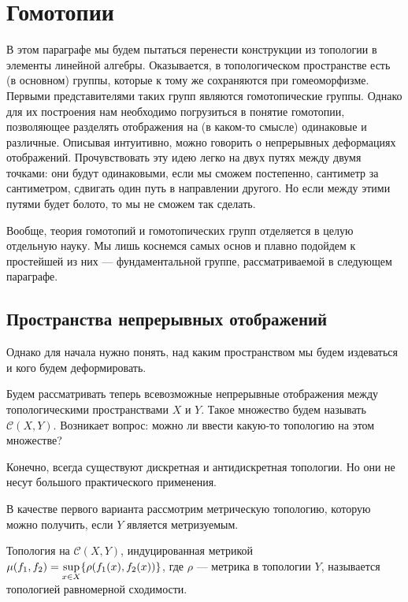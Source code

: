 \section{Гомотопии}
\begin{Intro}
В этом параграфе мы будем пытаться перенести конструкции из топологии в элементы линейной алгебры. Оказывается, в топологическом пространстве есть (в основном) группы, которые к тому же сохраняются при гомеоморфизме. Первыми представителями таких групп являются гомотопические группы. Однако для их построения нам необходимо погрузиться в понятие гомотопии, позволяющее разделять отображения на (в каком-то смысле) одинаковые и различные. Описывая интуитивно, можно говорить о непрерывных деформациях отображений. Прочувствовать эту идею легко на двух путях между двумя точками: они будут одинаковыми, если мы сможем постепенно, сантиметр за сантиметром, сдвигать один путь в направлении другого. Но если между этими путями будет болото, то мы не сможем так сделать.

Вообще, теория гомотопий и гомотопических групп отделяется в целую отдельную науку. Мы лишь коснемся самых основ и плавно подойдем к простейшей из них --- фундаментальной группе, рассматриваемой в следующем параграфе.
\end{Intro}
\subsection{Пространства непрерывных отображений}
Однако для начала нужно понять, над каким пространством мы будем издеваться и кого будем деформировать.

Будем рассматривать теперь всевозможные непрерывные отображения между топологическими пространствами $X$ и $Y$. Такое множество будем называть $\mathcal{C}(X, Y)$. Возникает вопрос: можно ли ввести какую-то топологию на этом множестве?

Конечно, всегда существуют дискретная и антидискретная топологии. Но они не несут большого практического применения.

В качестве первого варианта рассмотрим метрическую топологию, которую можно получить, если $Y$ является метризуемым. 
\begin{Def}
    Топология на $\mathcal{C}(X,Y)$, индуцированная метрикой $\mu(f_1, f_2) = \underset{\tiny x \in X}{\sup} \{\rho(f_1(x), f_2(x))\}$, где $\rho$ --- метрика в топологии $Y$, называется топологией равномерной сходимости.
\end{Def}

